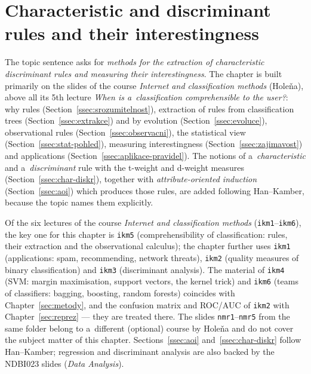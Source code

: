 \documentclass[11pt,a4paper]{article}
\theoremstyle{definition}
\begin{document}
\section{Characteristic and discriminant rules and their interestingness}
\label{sec:pravidla}

The topic sentence asks for \emph{methods for the extraction of characteristic
discriminant rules and measuring their interestingness}. The chapter is built primarily
on the slides of the course \emph{Internet and classification methods} (Holeňa), above
all its 5th lecture \emph{When is a~classification comprehensible to the user?}: why
rules (Section~\ref{ssec:srozumitelnost}), extraction of rules from classification trees
(Section~\ref{ssec:extrakce}) and by evolution (Section~\ref{ssec:evoluce}),
observational rules (Section~\ref{ssec:observacni}), the statistical view
(Section~\ref{ssec:stat-pohled}), measuring interestingness
(Section~\ref{ssec:zajimavost}) and applications
(Section~\ref{ssec:aplikace-pravidel}). The notions of a~\emph{characteristic} and
a~\emph{discriminant} rule with the t-weight and d-weight measures
(Section~\ref{ssec:char-diskr}), together with \emph{attribute-oriented induction}
(Section~\ref{ssec:aoi}) which produces those rules, are added following Han--Kamber,
because the topic names them explicitly.

\begin{poznbox}
\small
Of the six lectures of the course \emph{Internet and classification methods}
(\texttt{ikm1}--\texttt{ikm6}), the key one for this chapter is \texttt{ikm5}
(comprehensibility of classification: rules, their extraction and the observational
calculus); the chapter further uses \texttt{ikm1} (applications: spam, recommending,
network threats), \texttt{ikm2} (quality measures of binary classification) and
\texttt{ikm3} (discriminant analysis). The material of \texttt{ikm4} (SVM: margin
maximisation, support vectors, the kernel trick) and \texttt{ikm6} (teams of
classifiers: bagging, boosting, random forests) coincides with
Chapter~\ref{sec:metody}, and the confusion matrix and ROC/AUC of \texttt{ikm2} with
Chapter~\ref{sec:reprez} --- they are treated there. The slides
\texttt{nmr1}--\texttt{nmr5} from the same folder belong to a~different (optional)
course by Holeňa and do not cover the subject matter of this chapter. Sections~\ref{ssec:aoi} and~\ref{ssec:char-diskr} follow Han--Kamber; regression and
discriminant analysis are also backed by the NDBI023 slides (\emph{Data Analysis}).
\end{poznbox}
\end{document}
